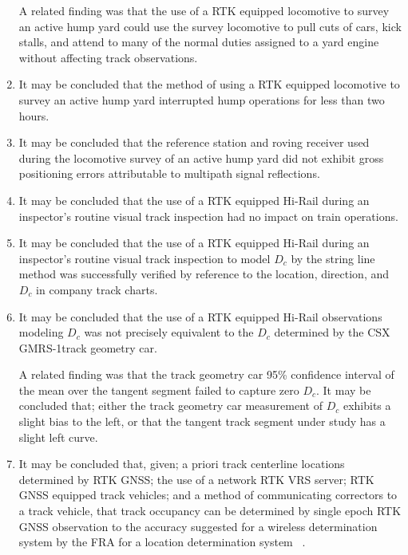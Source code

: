 \begin{enumerate}
A related finding was that the use of a RTK equipped locomotive to survey an active hump yard could use the survey locomotive to pull cuts of cars, kick stalls, and attend to many of the normal duties assigned to a yard engine without affecting track observations.

\item
It may be concluded that the method of using a RTK equipped locomotive to survey an active hump yard interrupted hump operations for less than two hours.

\item
It may be concluded that the reference station and roving receiver used during the locomotive survey of an active hump yard did not exhibit gross positioning errors attributable to multipath signal reflections.

\item
It may be concluded that the use of a RTK equipped Hi-Rail during an inspector's routine visual track inspection had no impact on train operations.

\item 
It may be concluded that the use of a RTK equipped Hi-Rail during an inspector's routine visual track inspection to model ${D_c}$ by the string line method was successfully verified by reference to the location, direction, and ${D_c}$ in company track charts. 

\item
It may be concluded that the use of a RTK equipped Hi-Rail observations modeling ${D_c}$ was not precisely equivalent to the ${D_c}$ determined by the CSX GMRS-1track geometry car.

A related finding was that the track geometry car 95\% confidence interval of the mean over the tangent segment failed to capture zero ${D_c}$. It may be concluded that; either the track geometry car measurement of ${D_c}$ exhibits a slight bias to the left, or that the tangent track segment under study has a slight left curve.


\item
It may be concluded that, given; a priori track centerline locations determined by RTK GNSS; the use of a network RTK VRS server; RTK GNSS equipped track vehicles; and a method of communicating correctors to a track vehicle, that track occupancy can be determined by single epoch RTK GNSS observation to the accuracy suggested for a wireless determination system by the FRA for a location determination system~\citep[pp.6-7]{1995FRADiffe} .

\end{enumerate}

